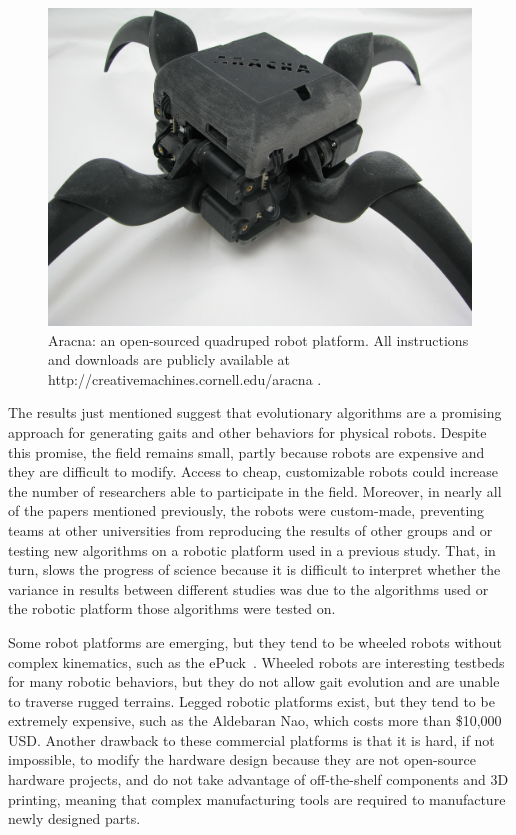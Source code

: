 \documentclass[letterpaper]{article}
\begin{document}
\begin{figure}[t]
\begin{center}
\includegraphics[width=\columnwidth]{fig1.jpg}
\caption{Aracna: an open-sourced quadruped robot platform. All
  instructions and downloads are publicly available at
  http://creativemachines.cornell.edu/aracna .}
\label{fig1}
\end{center}
\end{figure}

The results just mentioned suggest that evolutionary algorithms are a promising approach for generating gaits and other behaviors for physical robots. Despite this promise, the field remains small, partly because robots are expensive and they are difficult to modify. Access to cheap, customizable robots could increase the number of researchers able to participate in the field. Moreover, in nearly all of the papers mentioned previously, the robots were custom-made, preventing teams at other universities from reproducing the results of other groups and or testing new algorithms on a robotic platform used in a previous study. That, in turn, slows the progress of science because it is difficult to interpret whether the variance in results between different studies was due to the algorithms used or the robotic platform those algorithms were tested on.  

Some robot platforms are emerging, but they tend to be wheeled robots without complex kinematics, such as the ePuck~\citep{mondada2009puck}. Wheeled robots are interesting testbeds for many robotic behaviors, but they do not allow gait evolution and are unable to traverse rugged terrains. Legged robotic platforms exist, but they tend to be extremely expensive, such as the Aldebaran Nao, which costs more than \$10,000 USD. Another drawback to these commercial platforms is that it is hard, if not impossible, to modify the hardware design because they are not open-source hardware projects, and do not take advantage of off-the-shelf components and 3D printing, meaning that complex manufacturing tools are required to manufacture newly designed parts. 
\end{document}
